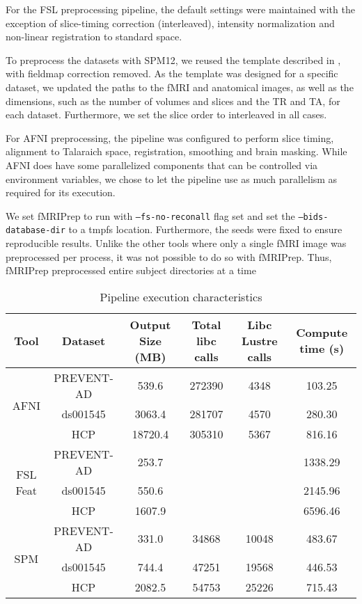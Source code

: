 \documentclass[10pt,journal,compsoc]{IEEEtran}
\begin{document}
For the FSL preprocessing pipeline, the default settings were maintained with the exception of slice-timing correction (interleaved),
intensity normalization and non-linear registration to standard space.

To preprocess the datasets with SPM12, we reused the template described in \cite{haitas2021}, with fieldmap correction removed.
As the template was designed for a specific dataset, we updated the paths to the fMRI and anatomical images,
as well as the dimensions, such as the number of volumes and slices and the TR and TA, for each dataset. Furthermore,
we set the slice order to interleaved in all cases. 

For AFNI preprocessing, the pipeline was configured to perform slice timing, alignment to Talaraich space, registration, smoothing
and brain masking. While AFNI does have some parallelized components that can be controlled via environment variables, we chose to let 
the pipeline use as much parallelism as required for its execution.

We set fMRIPrep to run with \texttt{--fs-no-reconall} flag set and set the \texttt{--bids-database-dir} to a tmpfs location. 
Furthermore, the seeds were fixed to ensure reproducible results. Unlike the other tools where only a single fMRI image was preprocessed
per process, it was not possible to do so with fMRIPrep. Thus, fMRIPrep preprocessed entire subject directories at a time


\begin{table*}[t]
  \small\centering
\begin{tabular}{|c c c c c c|}
  \hline
  Tool & Dataset &  Output Size (MB) & Total libc calls & Libc Lustre calls & Compute time (s) \\
  \hline
  \multirow{3}{1em}{AFNI} & PREVENT-AD & 539.6 & 272390 & 4348 & 103.25 \\
  & ds001545 & 3063.4 & 281707 & 4570  & 280.30 \\
  & HCP & 18720.4 & 305310 & 5367 & 816.16 \\
  \hline
  \multirow{3}{1em}{FSL Feat} & PREVENT-AD & 253.7 & &  & 1338.29 \\
  & ds001545 & 550.6 & &  & 2145.96 \\
  & HCP & 1607.9 & & & 6596.46 \\
  \hline
  \multirow{3}{1em}{SPM} & PREVENT-AD & 331.0 & 34868 & 10048 &  483.67 \\
  & ds001545 & 744.4 & 47251 & 19568 & 446.53 \\
  & HCP & 2082.5 & 54753 & 25226 & 715.43 \\

  \hline
\end{tabular}\caption{Pipeline execution characteristics}\label{table:pipelines}
\end{table*}
\end{document}
